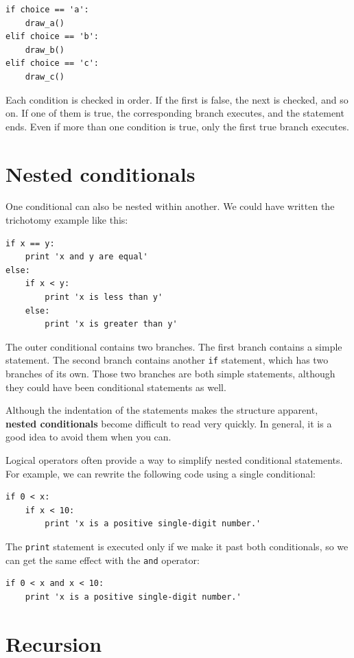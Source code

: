 \documentclass[10pt]{book}
\begin{document}
\begin{verbatim}
if choice == 'a':
    draw_a()
elif choice == 'b':
    draw_b()
elif choice == 'c':
    draw_c()
\end{verbatim}
%
Each condition is checked in order.  If the first is false,
the next is checked, and so on.  If one of them is
true, the corresponding branch executes, and the statement
ends.  Even if more than one condition is true, only the
first true branch executes.  


\section{Nested conditionals}

One conditional can also be nested within another.  We could have
written the trichotomy example like this:

\begin{verbatim}
if x == y:
    print 'x and y are equal'
else:
    if x < y:
        print 'x is less than y'
    else:
        print 'x is greater than y'
\end{verbatim}
%
The outer conditional contains two branches.  The
first branch contains a simple statement.  The second branch
contains another {\tt if} statement, which has two branches of its
own.  Those two branches are both simple statements,
although they could have been conditional statements as well.

Although the indentation of the statements makes the structure
apparent, {\bf nested conditionals} become difficult to read very
quickly. In general, it is a good idea to avoid them when you can.

Logical operators often provide a way to simplify nested conditional
statements.  For example, we can rewrite the following code using a
single conditional:

\begin{verbatim}
if 0 < x:
    if x < 10:
        print 'x is a positive single-digit number.'
\end{verbatim}
%
The {\tt print} statement is executed only if we make it past both
conditionals, so we can get the same effect with the {\tt and} operator:

\begin{verbatim}
if 0 < x and x < 10:
    print 'x is a positive single-digit number.'
\end{verbatim}


\section{Recursion}
\label{recursion}
\end{document}
